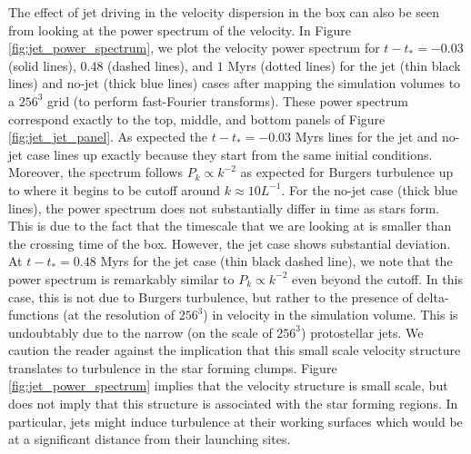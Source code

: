 \documentclass[../dissertation.tex]{subfiles}
\begin{document}
The effect of jet driving in the velocity dispersion in the box can also be seen from looking at the power spectrum of the velocity.
In Figure \ref{fig:jet_power_spectrum}, we plot the velocity power spectrum for $t-t_* = -0.03$ (solid lines), $0.48$ (dashed lines), and $1$ Myrs (dotted lines) for the jet (thin black lines) and no-jet (thick blue lines) cases after mapping the simulation volumes to a $256^3$ grid (to perform fast-Fourier transforms).
These power spectrum correspond exactly to the top, middle, and bottom panels of Figure \ref{fig:jet_jet_panel}.
As expected the $t-t_* = -0.03$ Myrs lines for the jet and no-jet case lines up exactly because they start from the same initial conditions.
Moreover, the spectrum follows $P_k\propto k^{-2}$ as expected for Burgers turbulence up to where it begins to be cutoff around $k\approx 10 L^{-1}$.
For the no-jet case (thick blue lines), the power spectrum does not substantially differ in time as stars form.
This is due to the fact that the timescale that we are looking at is smaller than the crossing time of the box.
However, the jet case shows substantial deviation.
At $t-t_* = 0.48$ Myrs for the jet case (thin black dashed line), we note that the power spectrum is remarkably similar to $P_k \propto k^{-2}$ even beyond the cutoff.
In this case, this is not due to Burgers turbulence, but rather to the presence of delta-functions (at the resolution of $256^3$) in velocity in the simulation volume.
This is undoubtably due to the narrow (on the scale of $256^3$) protostellar jets. We caution the reader against the implication that this small scale velocity structure translates to turbulence in the star forming clumps. Figure \ref{fig:jet_power_spectrum} implies that the velocity structure is small scale, but does not imply that this structure is associated with the star forming regions.  In particular, jets might induce turbulence at their working surfaces which would be at a significant distance from their launching sites.
\end{document}
